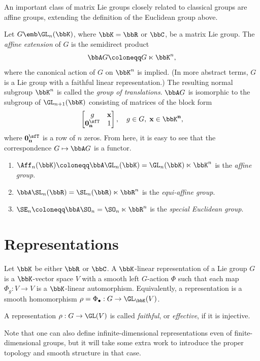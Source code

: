 An important class of matrix Lie groups closely related to classical groups are affine groups, extending the definition of the Euclidean group above.

\begin{defn}
    Let $G\emb \GL_n(\bbK)$, where $\bbK=\bbR$ or $\bbC$, be a matrix Lie group. The \emph{affine extension} of $G$ is the semidirect product 
    \[\bbA G\coloneqq G\ltimes \bbK^n,\]
    where the canonical action of $G$ on $\bbK^n$ is implied. (In more abstract terms, $G$ is a Lie group with a faithful linear representation.) The resulting normal subgroup $\bbK^n$ is called the \emph{group of translations}. $\bbA G$ is isomorphic to the subgroup of $\GL_{n+1}(\bbK)$ consisting of matrices of the block form
    \[\begin{bmatrix}
        g & \bf{x}\\
        \bf{0}_n^\sfT  & 1
    \end{bmatrix},\quad g\in G,\; \bf{x}\in\bbK^n,\]
    where $\bf{0}_n^\sfT $ is a row of $n$ zeros. From here, it is easy to see that the correspondence $G\mapsto \bbA G$ is a functor.
\end{defn}

\begin{example}
    \begin{enumerate}
        \item $\Aff_n(\bbK)\coloneqq \bbA \GL_n(\bbK)=\GL_n(\bbK)\ltimes\bbK^n$ is the \emph{affine group}.
        \item $\bbA \SL_n(\bbR)=\SL_n(\bbR)\ltimes \bbR^n$ is the \emph{equi-affine group}.
        \item $\SE_n\coloneqq \bbA \SO_n{}= \SO_n\ltimes\bbR^n$ is the \emph{special Euclidean group}.
    \end{enumerate}
\end{example}










\section{Representations}

\begin{defn}
    Let $\bbK$ be either $\bbR$ or $\bbC$. A $\bbK$-linear representation of a Lie group $G$ is a $\bbK$-vector space $V$ with a smooth left $G$-action $\Phi$ such that each map $\Phi_g:V\to V$ is a $\bbK$-linear automorphism. Equivalently, a representation is a smooth homomorphism $\rho=\Phi_\bullet:G\to \GL_{\bbK}(V)$. 

    A representation $\rho :G\to \GL(V)$ is called \emph{faithful}, or \emph{effective}, if it is injective.
\end{defn}
Note that one can also define infinite-dimensional representations even of finite-dimensional groups, but it will take some extra work to introduce the proper topology and smooth structure in that case.

